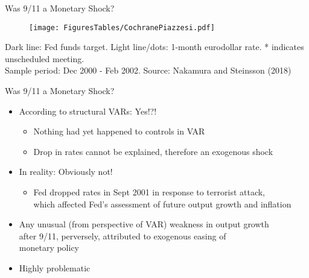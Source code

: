 \documentclass[11pt,aspectratio=169,xcolor={dvipsnames},hyperref={pdftex,pdfpagemode=UseNone,hidelinks,pdfdisplaydoctitle=true},usepdftitle=false]{beamer}
\begin{document}
\begin{frame}{Was 9/11 a Monetary Shock?}
\begin{figure}
\centering
\texttt{[image: FiguresTables/CochranePiazzesi.pdf]}
\end{figure}
\vspace{-15pt}
{\scriptsize Dark line: Fed funds target. Light line/dots: 1-month eurodollar rate. * indicates unscheduled meeting. \\ \vspace{-6pt} Sample period: Dec 2000 - Feb 2002. Source: Nakamura and Steinsson (2018)}
\end{frame}


\begin{frame}{Was 9/11 a Monetary Shock?}
\begin{itemize}
\itemsep1em 
\item According to structural VARs: Yes!?!
\begin{itemize}
\item Nothing had yet happened to controls in VAR
\item Drop in rates cannot be explained, therefore an exogenous shock
\end{itemize}
\item In reality: Obviously not!
\begin{itemize}
\item Fed dropped rates in Sept 2001 in response to terrorist attack, \\ which affected Fed's assessment of future output growth and inflation
\end{itemize}
\item Any unusual (from perspective of VAR) weakness in output growth \\ after 9/11, perversely, attributed to exogenous easing of \\ monetary policy
\item Highly problematic
\end{itemize}
\end{frame}
\end{document}
